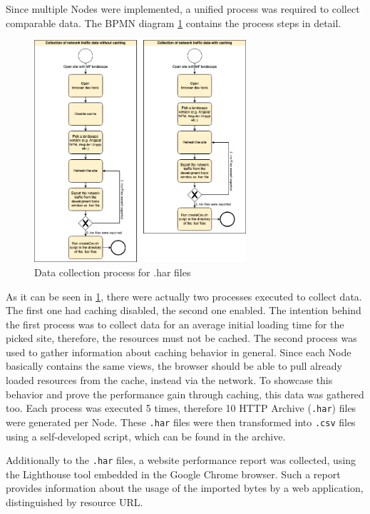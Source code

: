 Since multiple Nodes were implemented, a unified process was required to collect comparable data. The BPMN diagram \ref{fig:data_collection_process_har} contains the process steps in detail.

\begin{figure}[!h]
	\centering
	\includegraphics[width=0.7\textwidth]{Figures/Data_Collection_Process_har.drawio.png}
	\caption{Data collection process for .har files}
	\label{fig:data_collection_process_har}
\end{figure}

As it can be seen in \ref{fig:data_collection_process_har}, there were actually two processes executed to collect data. 
The first one had caching disabled, the second one enabled. 
The intention behind the first process was to collect data for an average initial loading time for the picked site, therefore, the resources must not be cached. 
The second process was used to gather information about caching behavior in general. 
Since each Node basically contains the same views, the browser should be able to pull already loaded resources from the cache, instead via the network. 
To showcase this behavior and prove the performance gain through caching, this data was gathered too.
Each process was executed 5 times, therefore 10 HTTP Archive (\texttt{.har}) files were generated per Node. 
These \texttt{.har} files were then transformed into \texttt{.csv} files using a self-developed script, which can be found in the archive.

Additionally to the \texttt{.har} files, a website performance report was collected, using the Lighthouse tool embedded in the Google Chrome browser. Such a report provides information about the usage of the imported bytes by a web application, distinguished by resource URL.

